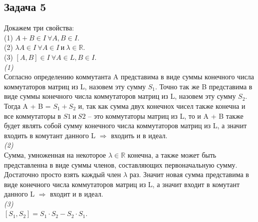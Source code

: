 	\subsection{Задача 5}
	Докажем три свойства: \\
	(1) $A+B \in I \ \forall A,B \in I$.\\
	(2) $\lambda A \in I \ \forall A \in I\  и\  \lambda \in \mathbb{R}$.\\
	(3) $[A,B] \in I \ \forall A \in L, B \in I$.\\
	\textit{(1)}\\
	Согласно определению коммутанта A представима в виде суммы конечного числа коммутаторов матриц из L, назовем эту сумму $S_1$. Точно так же B представима в виде суммы конечного числа коммутаторов матриц из L, назовем эту сумму $S_2$. Тогда A + B = $S_1 + S_2$ и, так как сумма двух конечнох чисел также конечна и все коммутаторы в $S1\  и\  S2$ -- это коммутаторы матриц из L, то и A + B также будет являть собой сумму конечного числа коммутаторов матриц из L, а значит входить в комутант данного L $\Rightarrow$ входить и в идеал. \\
	\textit{(2)}\\
	Сумма, умноженная на некоторое $\lambda \in \mathbb{R}$ конечна, а также может быть представленна в виде суммы членов, составляющих первоначальную сумму. Достаточно просто взять каждый член $\lambda$ раз. Значит новая сумма представима в виде конечного числа коммутаторов матриц из L, а значит входит в комутант данного L $\Rightarrow$ входит и в идеал. \\
	\textit{(3)}\\
	$[S_1, S_2] = S_1 \cdot S_2 - S_2 \cdot S_1$.
	
	